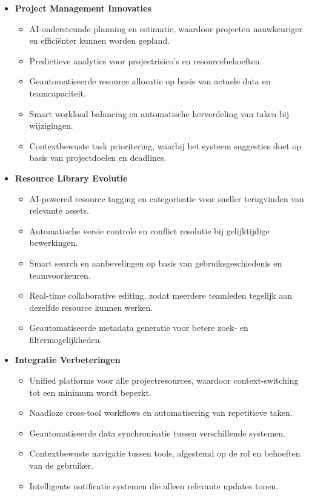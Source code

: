 \begin{itemize}
    \item \textbf{Project Management Innovaties}
    \begin{itemize}
        \item AI-ondersteunde planning en estimatie, waardoor projecten nauwkeuriger en efficiënter kunnen worden gepland.
        \item Predictieve analytics voor projectrisico's en resourcebehoeften.
        \item Geautomatiseerde resource allocatie op basis van actuele data en teamcapaciteit.
        \item Smart workload balancing en automatische herverdeling van taken bij wijzigingen.
        \item Contextbewuste task prioritering, waarbij het systeem suggesties doet op basis van projectdoelen en deadlines.
    \end{itemize}
    
    \item \textbf{Resource Library Evolutie}
    \begin{itemize}
        \item AI-powered resource tagging en categorisatie voor sneller terugvinden van relevante assets.
        \item Automatische versie controle en conflict resolutie bij gelijktijdige bewerkingen.
        \item Smart search en aanbevelingen op basis van gebruiksgeschiedenis en teamvoorkeuren.
        \item Real-time collaborative editing, zodat meerdere teamleden tegelijk aan dezelfde resource kunnen werken.
        \item Geautomatiseerde metadata generatie voor betere zoek- en filtermogelijkheden.
    \end{itemize}
    
    \item \textbf{Integratie Verbeteringen}
    \begin{itemize}
        \item Unified platforms voor alle projectresources, waardoor context-switching tot een minimum wordt beperkt.
        \item Naadloze cross-tool workflows en automatisering van repetitieve taken.
        \item Geautomatiseerde data synchronisatie tussen verschillende systemen.
        \item Contextbewuste navigatie tussen tools, afgestemd op de rol en behoeften van de gebruiker.
        \item Intelligente notificatie systemen die alleen relevante updates tonen.
    \end{itemize}
\end{itemize}

